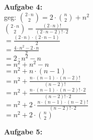 \documentclass[a4paper]{scrartcl}
\begin{document}
	\begin{flushleft}
		\textbf{Aufgabe 4:}\\
		geg: $\binom{2\cdot n}{2}=2\cdot\binom{n}{2}+n^2$\\[1em]
		$\binom{2\cdot n}{2}=\frac{(2\cdot n)!}{(2\cdot n-2)!\cdot 2}$\\
		$=\frac{(2\cdot n)\cdot (2\cdot n-1)}{2}$\\
		$=\frac{4\cdot n^2 - 2\cdot n}{2}$\\
		$=2\cdot n^2 - n$\\
		$=n^2 + n^2 - n$\\
		$=n^2 + n\cdot(n-1)$\\
		$=n^2+\frac{n\cdot(n-1)\cdot (n-2)!}{(n-2)!}$\\
		$=n^2+\frac{n\cdot(n-1)\cdot (n-2)!\cdot 2}{(n-2)!\cdot 2}$\\
		$=n^2+2\cdot\frac{n\cdot(n-1)\cdot (n-2)!}{(n-2)!\cdot 2}$\\
		$=n^2+2\cdot\binom{n}{2}$\\[1em]
	\end{flushleft}
	\begin{flushleft}
		\textbf{Aufgabe 5:}\\	
	\end{flushleft}
\end{document}

